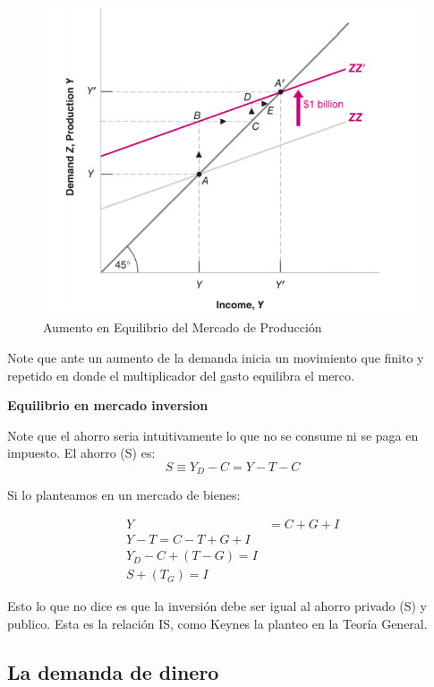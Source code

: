 \begin{figure}[H]
    \centering
    \includegraphics[scale=0.3]{Images/aumento.png}
    \caption{Aumento en Equilibrio del Mercado de Producción}
    \label{fig:auemnto}
\end{figure}

Note que ante un aumento de la demanda inicia un movimiento que finito y repetido en donde el multiplicador del gasto equilibra el merco.

\textbf{Equilibrio en mercado inversion}

Note que el ahorro seria intuitivamente lo que no se consume ni se paga en impuesto. El ahorro (S) es:
\begin{equation}
    S \equiv Y_{D}-C = Y-T-C
\end{equation}

Si lo planteamos en un mercado de bienes: 

\begin{align}
    Y & = C+ G + I\\
    Y-T= C-T+G+I\\
    Y_{D}-C+(T-G) =I\\
    S +(T_G) = I
\end{align}

Esto lo que no dice es que la inversión debe ser igual al ahorro privado (S) y publico. Esta es la relación IS, como Keynes la planteo en la Teoría General.

\subsection{La demanda de dinero}

